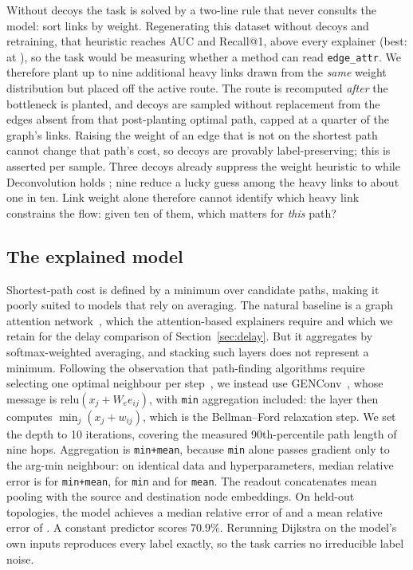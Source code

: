 \documentclass[conference]{IEEEtran}
\begin{document}
Without decoys the task is solved by a two-line rule that never consults the
model: sort links by weight.
Regenerating this dataset without decoys and retraining, that heuristic
reaches \DecoyZeroMaxWeightAUC{} AUC and \DecoyZeroMaxWeightRec{} Recall@1, above
every explainer (best: \DecoyZeroBestName{} at \DecoyZeroBestAUC), so the task would
be measuring whether a method can read \texttt{edge\_attr}. We therefore plant up to nine additional heavy links drawn from the
\emph{same} weight distribution but placed off the active route. The route is
recomputed \emph{after} the bottleneck is planted, and decoys are sampled
without replacement from the edges absent from that post-planting optimal
path, capped at a quarter of the graph's links. Raising the weight of an edge
that is not on the shortest path cannot change that path's cost, so decoys are
provably label-preserving; this is asserted per sample. Three decoys already
suppress the weight heuristic to \DecoyThreeMaxWeightAUC{} while Deconvolution
holds \DecoyThreeDeconvAUC; nine reduce a lucky guess among the heavy links to
about one in ten. Link weight alone therefore cannot identify which heavy link constrains the flow: given ten of them, which matters for \emph{this} path?

\subsection{The explained model}
\label{sec:model}
Shortest-path cost is defined by a minimum over candidate paths, making it poorly suited to models that rely on averaging. The natural baseline is a graph
attention network~\cite{velickovic2018gat}, which the attention-based
explainers require and which we retain for the delay comparison of
Section~\ref{sec:delay}. But it aggregates by softmax-weighted averaging, and
stacking such layers does not represent a minimum. Following the observation that path-finding
algorithms require selecting one optimal neighbour per
step~\cite{velickovic2020neuralexec}, we instead use
GENConv~\cite{li2020deepergcn}, whose message is
$\mathrm{relu}(x_j + W_e e_{ij})$, with \texttt{min} aggregation included:
the layer then computes $\min_j (x_j + w_{ij})$, which is the Bellman--Ford
relaxation step. We set the depth to 10 iterations, covering the measured 90th-percentile path length of nine hops. Aggregation is
\texttt{min+mean}, because \texttt{min} alone passes gradient only to the
arg-min neighbour: on identical data and hyperparameters, median relative
error is \AggrMinMean{} for \texttt{min+mean}, \AggrMinOnly{} for \texttt{min}
and \AggrMeanOnly{} for \texttt{mean}. The readout concatenates mean pooling with the source and
destination node embeddings. On held-out topologies, the model achieves a median relative error of \ModelMedRel{} and a mean relative error of \ModelMeanRel{}. A constant predictor scores $70.9\%$. Rerunning Dijkstra on the model's own inputs reproduces every label exactly, so the task carries no irreducible label noise.
\end{document}
